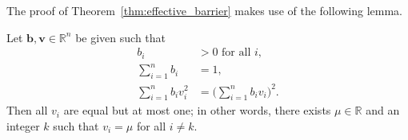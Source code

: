 The proof of Theorem~\ref{thm:effective_barrier} makes use of the following 
lemma.
\begin{lemma}\label{Davids_lemma}
	Let $\bm{b},\bm{v} \in \mathbb{R}^{n}$ be given such that
    \begin{subequations}\label{eq:DavidsLemma}
    		\begin{align}
    			b_i & > 0 \mbox{ for all } i, \label{eq:DavidsLemma_a} \\
    			\sum_{i=1}^n b_i & = 1, \label{eq:DavidsLemma_b} \\
    			\sum_{i=1}^n b_i v_i^2 & = \biggl(\sum_{i=1}^n b_i v_i\biggr)^{\!\! 2}. \label{eq:DavidsLemma_c}
    		\end{align}
    	\end{subequations}
    	Then all $v_i$ are equal but at most one; in other words, there exists 
    	$\mu \in \mathbb{R}$ and an integer $k$ such that $v_i = \mu$ for 
    	all $i \ne k$.
\end{lemma}

